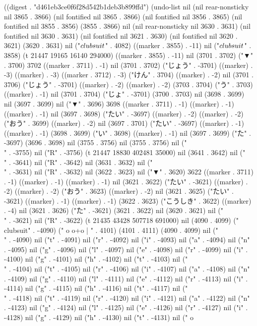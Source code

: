 
((digest . "d461eb3ce0f6f28d542b1deb3b899ffd") (undo-list nil (nil rear-nonsticky nil 3865 . 3866) (nil fontified nil 3865 . 3866) (nil fontified nil 3856 . 3865) (nil fontified nil 3855 . 3856) (3855 . 3866) nil (nil rear-nonsticky nil 3630 . 3631) (nil fontified nil 3630 . 3631) (nil fontified nil 3621 . 3630) (nil fontified nil 3620 . 3621) (3620 . 3631) nil ("$\\clubsuit$" . 4082) ((marker . 3855) . -11) nil ("$\\clubsuit$" . 3858) (t 21447 19165 16140 294000) ((marker . 3855) . -11) nil (3701 . 3702) ("▼" . 3700) 3702 ((marker . 3711) . -1) nil (3701 . 3702) ("じょう" . -3701) ((marker) . -3) ((marker) . -3) ((marker . 3712) . -3) ("けん" . 3704) ((marker) . -2) nil (3701 . 3706) ("じょう" . -3701) ((marker) . -2) ((marker) . -2) (3703 . 3704) ("う" . 3703) ((marker) . -1) nil (3701 . 3704) ("じょ" . -3701) (3700 . 3703) nil (3698 . 3699) nil (3697 . 3699) nil ("▼" . 3696) 3698 ((marker . 3711) . -1) ((marker) . -1) ((marker) . -1) nil (3697 . 3698) ("たい" . -3697) ((marker) . -2) ((marker) . -2) ("おう" . 3699) ((marker) . -2) nil (3697 . 3701) ("たい" . -3697) ((marker) . -1) ((marker) . -1) (3698 . 3699) ("い" . 3698) ((marker) . -1) nil (3697 . 3699) ("た" . -3697) (3696 . 3698) nil (3755 . 3756) nil (3755 . 3756) nil ("\\" . -3755) nil ("R" . -3756) (t 21447 18830 402481 35000) nil (3641 . 3642) nil ("\\" . -3641) nil ("R" . -3642) nil (3631 . 3632) nil ("\\" . -3631) nil ("R" . -3632) nil (3622 . 3623) nil ("▼" . 3620) 3622 ((marker . 3711) . -1) ((marker) . -1) ((marker) . -1) nil (3621 . 3622) ("たい" . -3621) ((marker) . -2) ((marker) . -2) ("おう" . 3623) ((marker) . -2) nil (3621 . 3625) ("たい" . -3621) ((marker) . -1) ((marker) . -1) (3622 . 3623) ("こうしき" . 3622) ((marker) . -4) nil (3621 . 3626) ("た" . -3621) (3621 . 3622) nil (3620 . 3621) nil ("\\" . -3621) nil ("R" . -3622) (t 21435 43428 507718 691000) nil (4090 . 4099) ("\\clubsuit" . -4090) (" o
o+o
 |
" . 4101) (4101 . 4111) (4090 . 4099) nil ("\\" . -4090) nil ("t" . -4091) nil ("r" . -4092) nil ("i" . -4093) nil ("a" . -4094) nil ("n" . -4095) nil ("g" . -4096) nil ("l" . -4097) nil ("e" . -4098) nil ("r" . -4099) nil ("i" . -4100) nil ("g" . -4101) nil ("h" . -4102) nil ("t" . -4103) nil ("\\" . -4104) nil ("t" . -4105) nil ("r" . -4106) nil ("i" . -4107) nil ("a" . -4108) nil ("n" . -4109) nil ("g" . -4110) nil ("l" . -4111) nil ("e" . -4112) nil ("r" . -4113) nil ("i" . -4114) nil ("g" . -4115) nil ("h" . -4116) nil ("t" . -4117) nil ("\\" . -4118) nil ("t" . -4119) nil ("r" . -4120) nil ("i" . -4121) nil ("a" . -4122) nil ("n" . -4123) nil ("g" . -4124) nil ("l" . -4125) nil ("e" . -4126) nil ("r" . -4127) nil ("i" . -4128) nil ("g" . -4129) nil ("h" . -4130) nil ("t" . -4131) nil (" o
